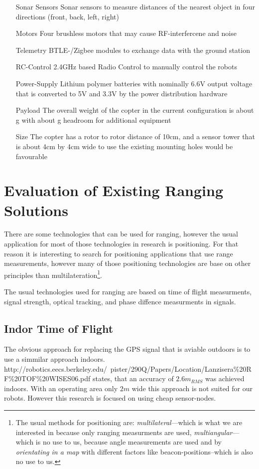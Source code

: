 \begin{itemize}
	\item[Sonar Sensors] Sonar sensors to measure distances of the nearest object in four directions (front, back, left, right)
	\item[Motors] Four brushless motors that may cause RF-interfercene and noise
	\item[Telemetry] BTLE-/Zigbee modules to exchange data with the ground station
	\item[RC-Control] 2.4GHz based Radio Control to manually control the robots
	\item[Power-Supply] Lithium polymer batteries with nominally 6.6V  output voltage that is converted to 5V and 3.3V by the power distribution hardware
	\item[Payload] The overall weight of the copter in the current configuration is about g with about g headroom for additional equipment
	\item[Size] The copter has a rotor to rotor distance of 10cm, and a sensor tower that is about 4cm by 4cm wide to use the existing mounting holes would be favourable
\end{itemize}

\section{Evaluation of Existing Ranging Solutions}
There are some technologies that can be used for ranging, however the usual application for most of those technologies in research is positioning.
For that reason it is interesting to search for positioning applications that use range measurements, however many of those positioning technologies are base on other principles than multilateration\footnote{The usual methods for positioning are: \emph{multilateral}—which is what we are interested in because only ranging measurments are used, \emph{multiangular}—which is no use  to us, because angle measurements are used and by \emph{orientating in a map} with different factors like beacon-positions–which is also no use to us.}.
\cite{_multilateration_2015}

The usual technologies used for ranging are based on time of flight measurments, signal strength, optical tracking, and phase diffence measurments in signals.

\subsection{Indor Time of Flight}
The obvious approach for replacing the GPS signal that is aviable outdoors is to use a simmilar approach indoors.
http://robotics.eecs.berkeley.edu/~pister/290Q/Papers/Location/Lanzisera\%20RF\%20TOF\%20WISES06.pdf  states, that an accuracy of $2.6m_{RMS}$ was achieved indoors.
With an operating area only $2m$ wide this approach is not suited for our robots.
However this research is focused on using cheap sensor-nodes.

